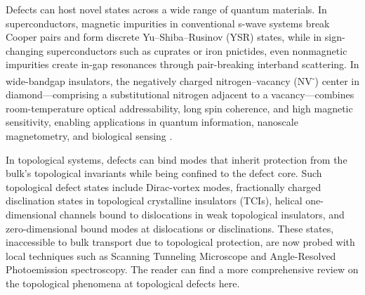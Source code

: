 Defects can host novel states across a wide range of quantum materials. In superconductors, magnetic impurities in conventional s-wave systems break Cooper pairs and form discrete Yu–Shiba–Rusinov (YSR) states\cite{pasnooriRiseFallYuShibaRusinov2022}\cite{ortuzarYuShibaRusinovStatesTwodimensional2022}, while in sign-changing superconductors such as cuprates or iron pnictides, even nonmagnetic impurities create in-gap resonances through pair-breaking interband scattering\cite{mashkooriImpurityBoundStates2017}\cite{alloulDefectsCorrelatedMetals2009}. In wide-bandgap insulators, the negatively charged nitrogen–vacancy (NV\textsuperscript{-}) center in diamond—comprising a substitutional nitrogen adjacent to a vacancy—combines room-temperature optical addressability, long spin coherence, and high magnetic sensitivity, enabling applications in quantum information, nanoscale magnetometry, and biological sensing \cite{dohertyNitrogenvacancyColourCentre2013}.

In topological systems, defects can bind modes that inherit protection from the bulk’s topological invariants while being confined to the defect core. Such topological defect states include Dirac-vortex modes\cite{gaoMajoranalikeZeroModes2019}\cite{menssenPhotonicTopologicalMode2020}, fractionally charged disclination states in topological crystalline insulators (TCIs)\cite{liuBulkdisclinationCorrespondenceTopological2021}\cite{petersonTrappedFractionalCharges2021}, helical one-dimensional channels bound to dislocations in weak topological insulators\cite{nayakResolvingTopologicalClassification2019}\cite{yeTopologicalDislocationModes2022}\cite{xueObservationDislocationInducedTopological2021}, and zero-dimensional bound modes at dislocations or disclinations\cite{grinbergTrappedStateDislocation2020}\cite{pauloseTopologicalModesBound2015}\cite{liTopologicalLighttrappingDislocation2018}\cite{dengObservationDegenerateZeroEnergy2022}. These states, inaccessible to bulk transport due to topological protection, are now probed with local techniques such as Scanning Tunneling Microscope and Angle-Resolved Photoemission spectroscopy. The reader can find a more comprehensive review on the topological phenomena at topological defects here\cite{linTopologicalPhenomenaTopological2022}.

\vspace{1cm}


